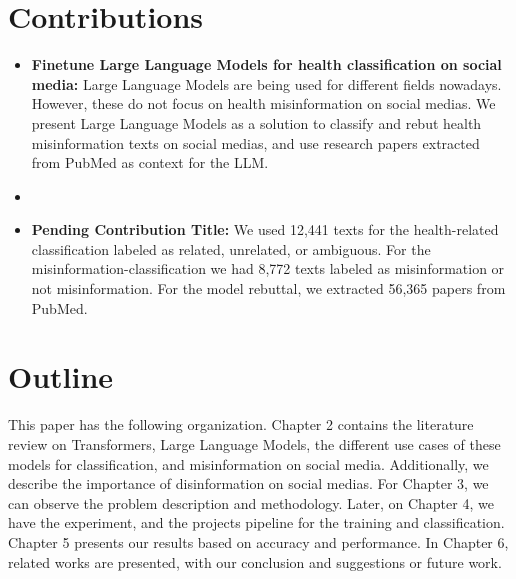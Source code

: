 \section{Contributions}
\noindent
\begin{itemize}
	\item \textbf{Finetune Large Language Models for health classification on social media:} Large Language Models are being used for different fields nowadays. However, these do not focus on health misinformation on social medias. We present Large Language Models as a solution
	to classify and rebut health misinformation texts on social medias, and use research papers extracted from PubMed as context for the LLM.
	\item \textbf{} 
	\item \textbf{Pending Contribution Title:} We used 12,441 texts for the health-related classification labeled as related, unrelated, or ambiguous. For the misinformation-classification we had 8,772 texts labeled as misinformation or not misinformation. For the model rebuttal, we extracted
	56,365 papers from PubMed.
	
\end{itemize}

\section{Outline}
\noindent
This paper has the following organization. Chapter 2 contains the literature review on Transformers, Large Language Models,
the different use cases of these models for classification, and misinformation on social media. Additionally, we describe the
importance of disinformation on social medias. For Chapter 3, we can observe the problem description and methodology.
Later, on Chapter 4, we have the experiment, and the projects pipeline for the training and classification. Chapter 5 presents
our results based on accuracy and performance. In Chapter 6, related works are presented, with our conclusion and suggestions 
or future work.